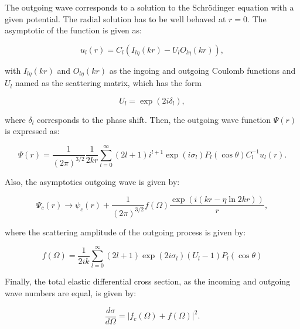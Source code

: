 \documentclass[openany]{book}
\begin{document}
The outgoing wave corresponds to a solution to the Schrödinger equation with a given potential. The radial solution has to be well behaved at $r = 0$. The asymptotic of the function is given as: 

 \begin{equation}\label{rmatrix_coulombPsi_u_asymptotics}
	u_l(r) = C_l (I_{l\eta}(kr) - U_lO_{l\eta}(kr)),
\end{equation}

with $I_{l\eta}(kr)$ and $O_{l\eta}(kr)$ as the ingoing and outgoing Coulomb functions and $U_l$ named as the scattering matrix, which has the form 

\begin{equation}\label{rmatrix_coulombPsi_collision}
	U_l = \exp {(2i\delta_l)},
\end{equation}

where $\delta_l$ corresponds to the phase shift. Then, the outgoing wave function $\Psi(r)$ is expressed as:

 \begin{equation}\label{rmatrix_coulombPsi_outgoing}
	\Psi(r) = \frac{1}{(2\pi)^{3/2}} \frac{1}{2kr} \sum_{l=0}^{\infty} {(2l + 1)i^{l+1} \exp {(i\sigma_l)} P_l(\cos \theta) C^{-1}_l u_l(r) }.
\end{equation}

Also, the asymptotics outgoing wave is given by: 

 \begin{equation}\label{rmatrix_coulombPsi_outgoing_asymptotics}
		\Psi_c(r) \rightarrow  \psi_c(r) + \frac{1}{(2\pi)^{3/2}} f(\Omega) \frac{\exp {(i(kr - \eta \ln {2kr}))}}{r},
\end{equation}

where the scattering amplitude of the outgoing process is given by: 

 \begin{equation}\label{rmatrix_coulombPsi_outgoing_scatteringAmplitude}
	f(\Omega) = \frac{1}{2ik} \sum_{l=0}^{\infty} {(2l+1)\exp {(2i\sigma_l) (U_l - 1)P_l(\cos \theta) }}
\end{equation}

Finally, the total elastic differential cross section, as the incoming and outgoing wave numbers are equal, is given by: 

 \begin{equation}\label{rmatrix_coulombPsi_total_scatteringAmplitude}
	\frac{d\sigma}{d\Omega} = |f_c(\Omega) + f(\Omega)|^2.
\end{equation}
\end{document}
